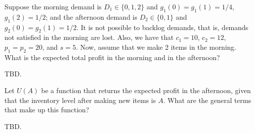 \begin{question}
Suppose the morning demand is $D_1\in \{0,1,2\}$ and $g_1(0)=g_1(1)=1/4$, $g_1(2)=1/2$; and the afternoon demand is $D_2\in \{0,1\}$ and $g_2(0)=g_2(1)=1/2$. It is not possible to backlog demands, that is,  demands not satisfied in the morning are lost. Also, we have that $c_1=10$, $c_2=12$, $p_1=p_2=20$, and $s=5$. Now, assume that we make 2 items in the morning. What is the expected total profit in the morning and in the afternoon?
\begin{solution}
TBD.

%
%
%
%
%
%
%
%

\end{solution}

\end{question}

\begin{question}
Let $U(A)$ be a function that returns the expected profit in the afternoon, given that the inventory level after making new items is $A$. What are the general terms that make up this function?
   \begin{solution}
     TBD.
   \end{solution}
\end{question}

